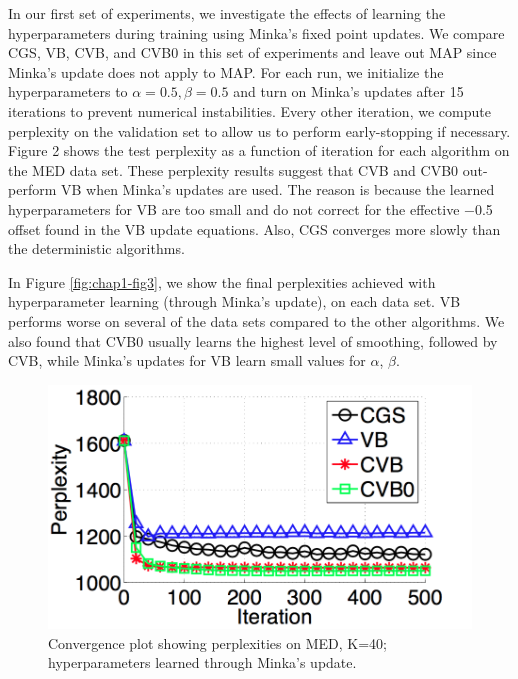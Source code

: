 In our first set of experiments, we investigate the effects of learning the hyperparameters during training using Minka’s fixed point updates. We compare CGS, VB, CVB, and CVB0 in this set of experiments and leave out MAP since Minka’s update does not apply to MAP. For each run, we initialize the hyperparameters to $\alpha = 0.5, \beta = 0.5$ and turn on Minka’s updates after 15 iterations to prevent numerical instabilities. Every other iteration, we compute perplexity on the validation set to allow us to perform early-stopping if necessary. Figure 2 shows the test perplexity as a function of iteration for each algorithm on the MED data set. These perplexity results suggest that CVB and CVB0 out- perform VB when Minka’s updates are used. The reason is because the learned hyperparameters for VB are too small and do not correct for the effective −0.5 offset found in the VB update equations. Also, CGS converges more slowly than the deterministic algorithms.

In Figure \ref{fig:chap1-fig3}, we show the final perplexities achieved with hyperparameter learning (through Minka’s update), on each data set. VB performs worse on several of the data sets compared to the other algorithms. We also found that CVB0 usually learns the highest level of smoothing, followed by CVB, while Minka’s updates for VB learn small values for $\alpha$, $\beta$.



\begin{figure}
  \centering
    \hspace*{-1.5cm}\includegraphics[height=0.22\textheight]{./Chap1/plots/figs/fig2.png}
  \caption{Convergence plot showing perplexities on MED, K=40; hyperparameters learned through Minka’s update.}
  \label{fig:chap1-fig5}
\end{figure}

